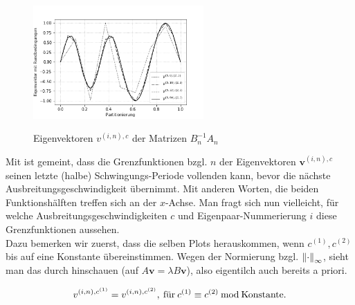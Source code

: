 \begin{figure}[H]
{    \includegraphics[width=65mm]{Aufgabe_2/images/plot_eigen_vectors_general/(2, 3), (3, 2)/plot_eigen_vectors_general(n_array = [8, 16, 32, 64], i = 5, c = (2, 3)).png}
  }
  \hspace{0mm}
  \caption{Eigenvektoren $v^{(i, n), c}$ der Matrizen $B_n^{-1} A_n$}
  \label{fig:Eigenvektoren_general}
\end{figure}

Mit  ist gemeint, dass die Grenzfunktionen bzgl. $n$ der Eigenvektoren $\mathbf{v}^{(i, n), c}$ seinen letzte (halbe) Schwingungs-Periode vollenden kann, bevor die nächste Ausbreitungsgeschwindigkeit übernimmt. Mit anderen Worten, die beiden Funktionshälften treffen sich an der $x$-Achse. Man fragt sich nun vielleicht, für welche Ausbreitungsgeschwindigkeiten $c$ und Eigenpaar-Nummerierung $i$ diese Grenzfunktionen  aussehen. \\

Dazu bemerken wir zuerst, dass die selben Plots herauskommen, wenn $c^{(1)}, c^{(2)}$ bis auf eine Konstante übereinstimmen. Wegen der Normierung bzgl. $\norm[\infty]{\cdot}$, sieht man das durch hinschauen (auf $A \mathbf{v} = \lambda B \mathbf{v}$), also eigentilch auch bereits a priori.

\begin{align*}
  v^{(i, n), c^{(1)}} = v^{(i, n), c^{(2)}}, \:
  \text{für} \:
  c^{(1)} \equiv c^{(2)} \Mod \text{Konstante}.
\end{align*}


